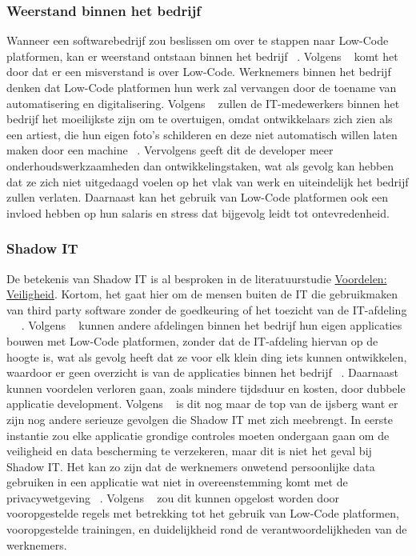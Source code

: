 \subsubsection*{Weerstand binnen het bedrijf}
\label{subsec:weerstand-binnen-het-bedrijf}
Wanneer een softwarebedrijf zou beslissen om over te stappen naar Low-Code platformen, kan er weerstand ontstaan binnen het bedrijf ~\autocite{Elshan2023}. 
Volgens ~\textcite{Elshan2023} komt het door dat er een misverstand is over Low-Code. 
Werknemers binnen het bedrijf denken dat Low-Code platformen hun werk zal vervangen door de toename van automatisering en digitalisering. 
Volgens ~\textcite{Elshan2023} zullen de IT-medewerkers binnen het bedrijf het moeilijkste zijn om te overtuigen, omdat ontwikkelaars zich zien als een artiest, 
die hun eigen foto's schilderen en deze niet automatisch willen laten maken door een machine ~\autocite{Elshan2023}. 
Vervolgens geeft dit de developer meer onderhoudswerkzaamheden dan ontwikkelingstaken, 
wat als gevolg kan hebben dat ze zich niet uitgedaagd voelen op het vlak van werk en uiteindelijk het bedrijf zullen verlaten. 
Daarnaast kan het gebruik van Low-Code platformen ook een invloed hebben op hun salaris en stress dat bijgevolg leidt tot ontevredenheid.
\subsubsection*{Shadow IT}
\label{subsec:shadow-it}
De betekenis van Shadow IT is al besproken in de literatuurstudie \hyperref[subsec:veiligheid]{Voordelen: Veiligheid}. Kortom, het gaat hier om de mensen buiten de IT die gebruikmaken van third party software
zonder de goedkeuring of het toezicht van de IT-afdeling ~\autocite{Yan2021} ~\autocite{Rokis_2022}. 
 Volgens ~\textcite{Elshan2023} kunnen andere afdelingen binnen het bedrijf hun eigen applicaties bouwen met Low-Code platformen, 
 zonder dat de IT-afdeling hiervan op de hoogte is, wat als gevolg heeft dat ze voor elk klein ding iets kunnen ontwikkelen, waardoor er geen overzicht is van de applicaties binnen het bedrijf ~\autocite{Elshan2023}. 
 Daarnaast kunnen voordelen verloren gaan, zoals mindere tijdsduur en kosten, door dubbele applicatie development. 
 Volgens ~\textcite{Elshan2023} is dit nog maar de top van de ijsberg want er zijn nog andere serieuze gevolgen die Shadow IT met zich meebrengt. 
 In eerste instantie zou elke applicatie grondige controles moeten ondergaan gaan om de veiligheid en data bescherming te verzekeren, 
 maar dit is niet het geval bij Shadow IT. Het kan zo zijn dat de werknemers onwetend persoonlijke data gebruiken in een applicatie wat niet in overeenstemming 
 komt met de privacywetgeving ~\autocite{Elshan2023}. Volgens ~\textcite{Elshan2023} zou dit kunnen opgelost worden door vooropgestelde regels met betrekking tot het 
 gebruik van Low-Code platformen, vooropgestelde trainingen, en duidelijkheid rond de verantwoordelijkheden van de werknemers.

